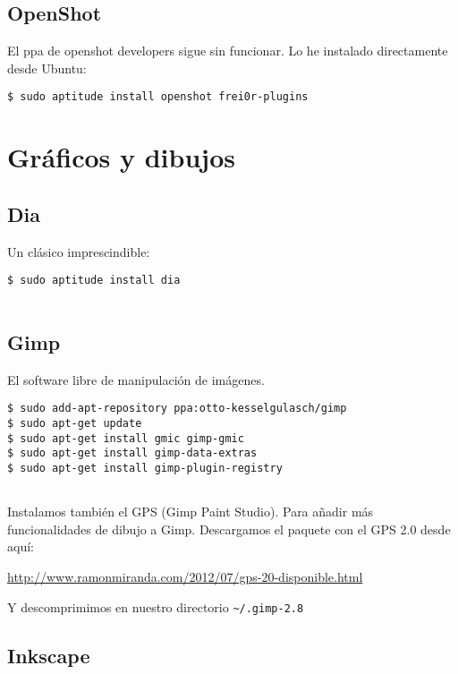 \subsection{OpenShot}\label{openshot}

El ppa de openshot developers sigue sin funcionar. Lo he instalado
directamente desde Ubuntu:

\begin{verbatim}
$ sudo aptitude install openshot frei0r-plugins
\end{verbatim}

\section{Gráficos y dibujos}\label{gruxe1ficos-y-dibujos}

\subsection{Dia}\label{dia}

Un clásico imprescindible:

\begin{verbatim}
$ sudo aptitude install dia
      
\end{verbatim}

\subsection{Gimp}\label{gimp}

El software libre de manipulación de imágenes.

\begin{verbatim}
$ sudo add-apt-repository ppa:otto-kesselgulasch/gimp
$ sudo apt-get update
$ sudo apt-get install gmic gimp-gmic
$ sudo apt-get install gimp-data-extras
$ sudo apt-get install gimp-plugin-registry
      
\end{verbatim}

Instalamos también el GPS (Gimp Paint Studio). Para añadir más
funcionalidades de dibujo a Gimp. Descargamos el paquete con el GPS 2.0
desde aquí:

\url{http://www.ramonmiranda.com/2012/07/gps-20-disponible.html}

Y descomprimimos en nuestro directorio
\texttt{\textasciitilde{}/.gimp-2.8}

\subsection{Inkscape}\label{inkscape}

